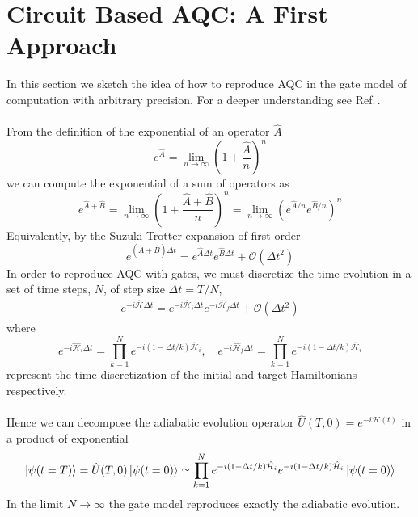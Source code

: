 \section{Circuit Based AQC: A First Approach}
In this section we sketch the idea of how to reproduce AQC in the gate model of computation with arbitrary precision. For a deeper understanding see Ref.\,\cite{Farhi2014AAlgorithm}.\\\\
From the definition of the exponential of an operator $\hat{A}$
\begin{equation}
    e^{\hat{A}}=\lim_{n\rightarrow \infty}\left( 1 + \frac{\hat{A}}{n}\right)^{n}
\end{equation}
we can compute the exponential of a sum of operators as
\begin{equation}
    e^{\hat{A}+\hat{B}}=\lim_{n\rightarrow \infty}\left( 1 + \frac{\hat{A} + \hat{B}}{n}\right)^{n} = \lim_{n\rightarrow \infty}\left(e^{\hat{A}/n}e^{\hat{B}/n}\right)^{n}
\end{equation}
Equivalently, by the Suzuki-Trotter expansion of first order 
\begin{equation}
        e^{\left(\hat{A}+\hat{B}\right)\Delta t} = e^{\hat{A}\Delta t}e^{\hat{B}\Delta t} + \mathcal{O}(\Delta t^{2})
\end{equation}
In order to reproduce AQC with gates, we must discretize the time evolution in a set of time steps, $N$, of step size $\Delta t = T/N$,
\begin{align}
    e^{-i\hat{\mathcal{H}}\Delta t} = e^{-i\hat{\mathcal{H}}_{i}\Delta t}e^{-i\hat{\mathcal{H}}_{f}\Delta t} + \mathcal{O}(\Delta t^{2})
\end{align}
where
\begin{equation}
    e^{-i\hat{\mathcal{H}}_{i}\Delta t} = \prod_{k=1}^{N}e^{-i\left(1-\Delta t/k\right)\hat{\mathcal{H}}_{i}}, \quad e^{-i\hat{\mathcal{H}}_{f}\Delta t} = \prod_{k=1}^{N}e^{-i\left(1-\Delta t/k\right)\hat{\mathcal{H}}_{i}}
\end{equation}
represent the time discretization of the initial and target Hamiltonians respectively. \\\\
Hence we can decompose the adiabatic evolution operator $\hat{U}(T,0) = e^{-i\mathcal{H}(t)}$ in a product of exponential
\begin{equation}
    \ket{\psi(t = T)} = \hat{U}(T,0)\ket{\psi(t = 0)} \simeq \prod_{k=1}^{N}e^{-i\left(1-\Delta t/k\right)\hat{\mathcal{H}}_{i}}e^{-i\left(1-\Delta t/k\right)\hat{\mathcal{H}}_{i}}\ket{\psi(t = 0)} 
\end{equation}
In the limit $N \rightarrow \infty$ the gate model reproduces exactly the adiabatic evolution.
